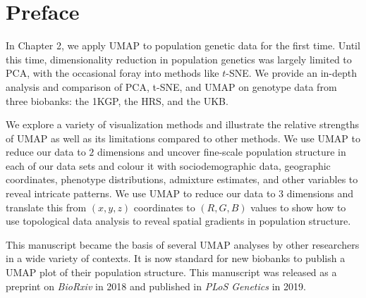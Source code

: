 \setcounter{section}{-1}

\section{Preface}

In Chapter 2, we apply UMAP to population genetic data for the first time. Until this time, dimensionality reduction in population genetics was largely limited to PCA, with the occasional foray into methods like $t$-SNE. We provide an in-depth analysis and comparison of PCA, t-SNE, and UMAP on genotype data from three biobanks: the 1KGP, the HRS, and the UKB.

We explore a variety of visualization methods and illustrate the relative strengths of UMAP as well as its limitations compared to other methods. We use UMAP to reduce our data to $2$ dimensions and uncover fine-scale population structure in each of our data sets and colour it with sociodemographic data, geographic coordinates, phenotype distributions, admixture estimates, and other variables to reveal intricate patterns. We use UMAP to reduce our data to $3$ dimensions and translate this from $(x,y,z)$ coordinates to $(R,G,B)$ values to show how to use topological data analysis to reveal spatial gradients in population structure.

This manuscript became the basis of several UMAP analyses by other researchers in a wide variety of contexts. It is now standard for new biobanks to publish a UMAP plot of their population structure. This manuscript was released as a preprint on \textit{BioRxiv} in 2018 and published in \textit{PLoS Genetics} in 2019.

\clearpage